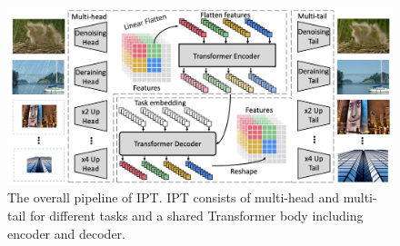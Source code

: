 \documentclass[10pt,twocolumn,letterpaper]{article}
\begin{document}
\begin{figure}[t]
    \includegraphics[width=\linewidth]{assets/ipt.png}
    \caption{\label{fig:overview}The overall pipeline of IPT. IPT consists of multi-head and multi-tail for different tasks and a shared Transformer body including encoder and decoder.}
\end{figure}




{\small


}
\end{document}
